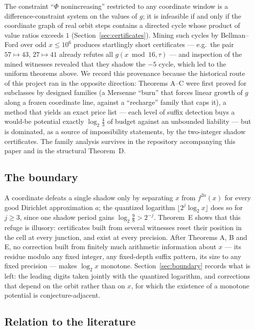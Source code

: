\documentclass[11pt]{article}
\theoremstyle{definition}
\theoremstyle{remark}
\begin{document}
The constraint ``$\Phi$ nonincreasing'' restricted to any coordinate
window is a difference-constraint system on the values of $g$; it is
infeasible if and only if the coordinate graph of real orbit steps
contains a directed cycle whose product of value ratios exceeds $1$
(Section~\ref{sec:certificates}). Mining such cycles by Bellman--Ford
over odd $x\le10^6$ produces startlingly short certificates --- e.g.\
the pair $57\mapsto43$, $27\mapsto41$ already refutes all
$g(x\bmod16,\tau)$ --- and inspection of the mined witnesses revealed
that they shadow the $-5$ cycle, which led to the uniform theorems
above. We record this provenance because the historical route of this
project ran in the opposite direction: Theorems A--C were first proved
for subclasses by designed families (a Mersenne ``burn'' that forces
linear growth of $g$ along a frozen coordinate line, against a
``recharge'' family that caps it), a method that yields an exact price
list --- each level of suffix detection buys a would-be potential
exactly $\log_2\frac43$ of budget against an unbounded liability ---
but is dominated, as a source of impossibility statements, by the
two-integer shadow certificates. The family analysis survives in the
repository accompanying this paper and in the structural
Theorem~D.

\subsection*{The boundary}

A coordinate defeats a single shadow only by separating $x$ from
$f^{2a}(x)$ for every good Dirichlet approximation $a$; the quantized
logarithm $\lfloor2^{j}\log_2x\rfloor$ does so for $j\ge3$, since one
shadow period gains $\log_2\tfrac98>2^{-j}$. Theorem~E shows that
this refuge is illusory: certificates built from several witnesses
reset their position in the cell at every junction, and exist at every
precision. After Theorems A, B and E, no correction built from finitely
much arithmetic information about $x$ --- its residue modulo any fixed
integer, any fixed-depth suffix pattern, its size to any fixed precision
--- makes $\log_2x$ monotone. Section~\ref{sec:boundary} records what
is left: the leading digits taken jointly with the quantized logarithm,
and corrections that depend on the orbit rather than on $x$, for which
the existence of a monotone potential is conjecture-adjacent.

\subsection*{Relation to the literature}
\end{document}
